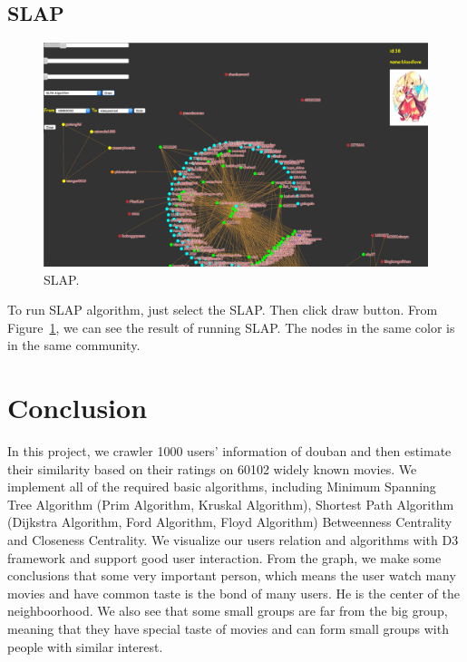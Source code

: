 \documentclass{article}
\begin{document}
\subsection{SLAP}
\begin{figure}[h]
  \centering
  \includegraphics[width=0.8\columnwidth]{slap.png}
  \caption{SLAP.}
  \label{fig:slap}
\end{figure}
To run SLAP algorithm, just select the SLAP. Then click draw button. From Figure~\ref{fig:slap}, we can see the result of running SLAP. The nodes in the same color is in the same community. \\ 

 
\section{Conclusion}
In this project, we crawler 1000 users' information of douban and then estimate their similarity based on their ratings on 60102 widely known movies. We implement all of the required basic algorithms, including Minimum Spanning Tree Algorithm (Prim Algorithm, Kruskal Algorithm), Shortest Path Algorithm (Dijkstra Algorithm, Ford Algorithm, Floyd Algorithm) Betweenness Centrality and Closeness Centrality. We visualize our users relation and algorithms with D3 framework and support good user interaction. From the graph, we make some conclusions that some very important person, which means the user watch many movies and have common taste is the bond of many users. He is the center of the neighboorhood. We also see that some small groups are far from the big group, meaning that they have special taste of movies and can form small groups with people with similar interest.

\begin{small}

 
\end{small}

\medskip
\end{document}
